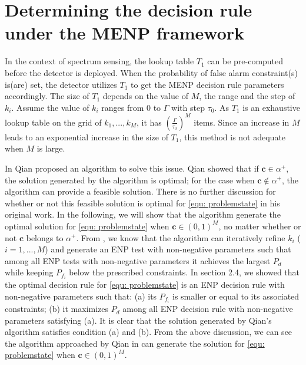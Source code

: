 
\section{Determining the decision rule under the MENP framework}
In the context of spectrum sensing, the lookup table $T_1$ can be pre-computed  before the detector is deployed. When the probability of false alarm constraint(s) is(are) set, the detector utilizes $T_1$ to get the MENP decision  rule parameters accordingly. The size of $T_1$ depends on the value of $M$, the range and the step of $k_i$.  Assume the value of $k_i$ ranges from $0$ to $\Gamma$ with step $\tau_0$. As $T_1$ is an exhaustive lookup table on the grid of $k_1, ..., k_M$, it has $(\frac{\Gamma}{\tau_0})^M$ items. Since an increase in $M$ leads to an exponential increase in the size of $T_1$, this method is not adequate when $M$ is large. 

In \cite{zhang1999design, zhang2000efficient} Qian proposed an algorithm to solve this issue. 
 Qian showed that if $\mathbf{c} \in \alpha^+$, the solution generated by the algorithm is optimal; 
 for the case when $\mathbf{c} \notin \alpha^+$, the algorithm can provide a feasible solution. There is no further discussion for whether or not this feasible solution is optimal for \eqref{equ: problemstate} in his original work.  
In the following, we will show that the algorithm generate the optimal solution for \eqref{equ: problemstate} when $\mathbf{c} \in (0, 1)^M$, no matter whether or not $\mathbf{c}$ belongs to $\alpha^+$. 
From \cite{zhang1999design, zhang2000efficient}, we know that the algorithm can iteratively refine $k_i$ ($i=1, ..., M$) and generate an ENP test with non-negative parameters such that among all ENP tests with non-negative parameters it achieves the largest $P_d$ while keeping $P_{f_i}$ below the prescribed constraints. 
In section 2.4, we showed that the optimal decision rule for \eqref{equ: problemstate} is an ENP decision rule  with non-negative parameters such that: (a) its $P_{f_i}$ is smaller or equal to its associated constraints; (b) it maximizes $P_d$ among all ENP decision rule with non-negative parameters satisfying (a).  
It is clear that the solution generated by Qian's algorithm satisfies condition (a) and (b).
From the above discussion, we can see the  algorithm approached by Qian in \cite{zhang1999design, zhang2000efficient} can generate the solution for \eqref{equ: problemstate} when $\mathbf{c} \in (0, 1)^M$.

